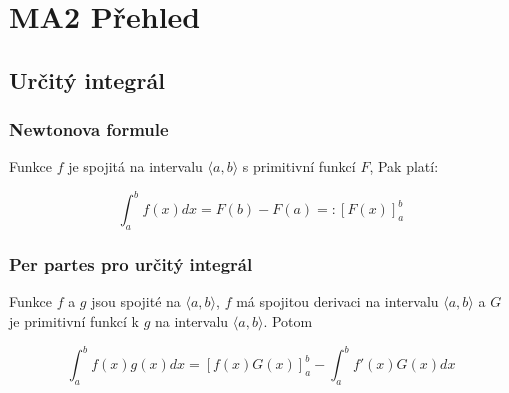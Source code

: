 \documentclass[a4paper]{article}
\begin{document}
\section*{MA2 Přehled}
\subsection*{Určitý integrál}

\subsubsection*{Newtonova formule}

Funkce $f$ je spojitá na intervalu $\langle a, b \rangle$ s primitivní funkcí $F$, Pak platí: 

\[ \int_a^b f(x) dx = F(b) - F(a) =:\left[ F(x) \right]_a^b \]

\subsubsection*{Per partes pro určitý integrál}

Funkce $f$ a $g$ jsou spojité na $\langle a, b \rangle$, $f$ má spojitou derivaci na intervalu $\langle a, b \rangle$ a $G$ je primitivní funkcí k $g$ na intervalu $\langle a, b \rangle$. Potom

\[ \int_a^b f(x)g(x) dx =  \left[ f(x)G(x) \right]_a^b - \int_a^b f'(x)G(x) dx\]
\end{document}
